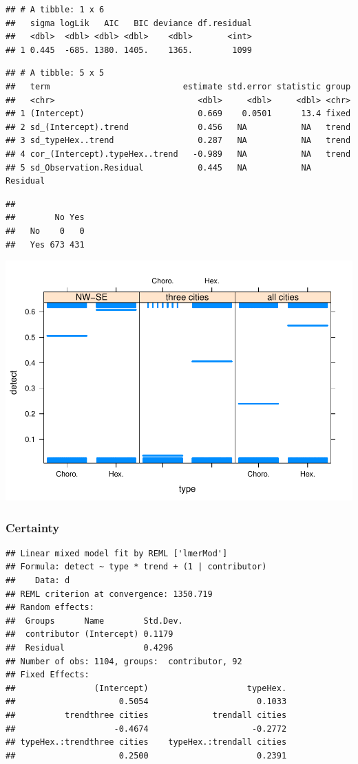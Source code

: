 \documentclass[conference,final,]{IEEEtran}
\makeatletter
\def\maxwidth{\ifdim\Gin@nat@width>\linewidth\linewidth
\else\Gin@nat@width\fi}
\let\Oldincludegraphics\includegraphics
\renewcommand{\includegraphics}[1]{\Oldincludegraphics[width=\maxwidth]{#1}}
\makeatother
\begin{document}
\begin{verbatim}
## # A tibble: 1 x 6
##   sigma logLik   AIC   BIC deviance df.residual
##   <dbl>  <dbl> <dbl> <dbl>    <dbl>       <int>
## 1 0.445  -685. 1380. 1405.    1365.        1099
\end{verbatim}

\begin{verbatim}
## # A tibble: 5 x 5
##   term                           estimate std.error statistic group   
##   <chr>                             <dbl>     <dbl>     <dbl> <chr>   
## 1 (Intercept)                       0.669    0.0501      13.4 fixed   
## 2 sd_(Intercept).trend              0.456   NA           NA   trend   
## 3 sd_typeHex..trend                 0.287   NA           NA   trend   
## 4 cor_(Intercept).typeHex..trend   -0.989   NA           NA   trend   
## 5 sd_Observation.Residual           0.445   NA           NA   Residual
\end{verbatim}

\begin{verbatim}
##      
##        No Yes
##   No    0   0
##   Yes 673 431
\end{verbatim}

\includegraphics{paper_files/figure-latex/unnamed-chunk-11-1.pdf}

\hypertarget{certainty-1}{%
\subsubsection{Certainty}\label{certainty-1}}

\begin{verbatim}
## Linear mixed model fit by REML ['lmerMod']
## Formula: detect ~ type * trend + (1 | contributor)
##    Data: d
## REML criterion at convergence: 1350.719
## Random effects:
##  Groups      Name        Std.Dev.
##  contributor (Intercept) 0.1179  
##  Residual                0.4296  
## Number of obs: 1104, groups:  contributor, 92
## Fixed Effects:
##                (Intercept)                    typeHex.  
##                     0.5054                      0.1033  
##          trendthree cities             trendall cities  
##                    -0.4674                     -0.2772  
## typeHex.:trendthree cities    typeHex.:trendall cities  
##                     0.2500                      0.2391
\end{verbatim}
\end{document}
